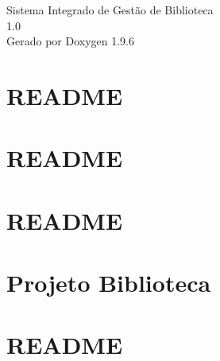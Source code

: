 \documentclass[twoside]{book}
\newcommand{\+}{\discretionary{\mbox{\scriptsize$\hookleftarrow$}}{}{}}
\newcommand{\clearemptydoublepage}{%
    \newpage{\pagestyle{empty}\cleardoublepage}%
  }
\begin{document}
  \raggedbottom
    \hypersetup{pageanchor=false,
                bookmarksnumbered=true,
                pdfencoding=unicode
               }
  \begin{titlepage}
  \vspace*{7cm}
  \begin{center}%
  {\Large Sistema Integrado de Gestão de Biblioteca}\\
  [1ex]\large 1.\+0 \\
  \vspace*{1cm}
  {\large Gerado por Doxygen 1.9.6}\\
  \end{center}
  \end{titlepage}
  \clearemptydoublepage
  \tableofcontents
  \clearemptydoublepage
  \hypersetup{pageanchor=true}
\chapter{README}
\label{md__c___projetos__b_t_i__projeto__l_p1__u_n_d2_bin__r_e_a_d_m_e}

\chapter{README}
\label{md__c___projetos__b_t_i__projeto__l_p1__u_n_d2_build__r_e_a_d_m_e}

\chapter{README}
\label{md__r_e_a_d_m_e}

\chapter{Projeto Biblioteca}
\label{md__c___projetos__b_t_i__projeto__l_p1__u_n_d2__r_e_a_d_m_e}

\chapter{README}
\label{md__c___projetos__b_t_i__projeto__l_p1__u_n_d2_tests__r_e_a_d_m_e}

\end{document}
